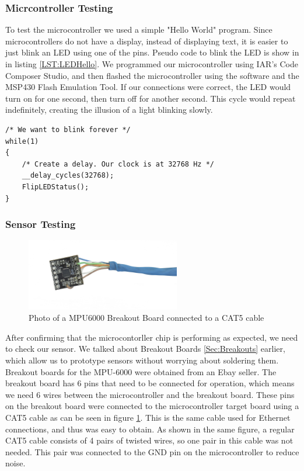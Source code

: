 \subsubsection{Micrcontroller Testing}
To test the microcontroller we used a simple "Hello World" program.
Since microcontrollers do not have a display, instead of displaying text,
it is easier to just blink an LED using one of the pins.
Pseudo code to blink the LED is show in in listing \ref{LST:LEDHello}.
We programmed our microcontroller using IAR's Code Composer Studio,
and then flashed the microcontroller using the software and the MSP430 Flash Emulation Tool.
If our connections were correct,
the LED would turn on for one second,
then turn off for another second.
This cycle would repeat indefinitely, creating the illusion of a light blinking slowly.
\begin{lstlisting}[caption=My caption,label=LST:LEDHello]
/* We want to blink forever */
while(1)
{
	/* Create a delay. Our clock is at 32768 Hz */
	__delay_cycles(32768);
	FlipLEDStatus();  
}
\end{lstlisting}


\subsubsection{Sensor Testing}
\label{Sec:SensorTesting}
\begin{figure}
\begin{center}
\includegraphics[width=0.6\textwidth]{images/CAT6MPU.jpg}
\caption{Photo of a MPU6000 Breakout Board connected to a CAT5 cable}
\label{Fig:CAt5MPU}
\end{center}
\end{figure}

After confirming that the microcontorller chip is performing as expected,
we need to check our sensor. We talked about Breakout Boards \ref{Sec:Breakouts} earlier,
which allow us to prototype sensors without worrying about soldering them.
Breakout boards for the MPU-6000 were obtained from an Ebay seller.
The breakout board has 6 pins that need to be connected for operation,
which means we need 6 wires between the microcontroller and the breakout board.
These pins on the breakout board were connected to the microcontroller target board using a CAT5 cable as can be seen in figure \ref{Fig:CAt5MPU}.
This is the same cable used for Ethernet connections, and thus was easy to obtain.
As shown in the same figure,
a regular CAT5 cable consists of 4 pairs of twisted wires,
so one pair in this cable was not needed.
This pair was connected to the GND pin on the microcontroller to reduce noise.

